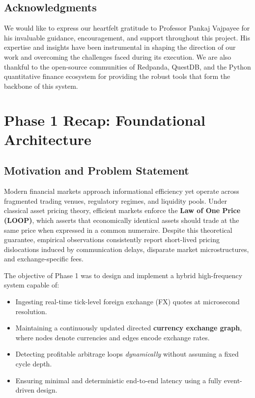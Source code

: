 \documentclass[letterpaper,11pt]{report}
\begin{document}
\newpage

\section*{Acknowledgments}\label{section:acknowledgments}
\pagestyle{plain}

We would like to express our heartfelt gratitude to Professor Pankaj Vajpayee for his invaluable guidance, encouragement, and support throughout this project. His expertise and insights have been instrumental in shaping the direction of our work and overcoming the challenges faced during its execution. We are also thankful to the open-source communities of Redpanda, QuestDB, and the Python quantitative finance ecosystem for providing the robust tools that form the backbone of this system.
\vspace{2in}

\newpage

\tableofcontents
\newpage

\setcounter{page}{1}

\chapter{Phase 1 Recap: Foundational Architecture}

\section{Motivation and Problem Statement}

Modern financial markets approach informational efficiency yet operate across fragmented trading venues, regulatory regimes, and liquidity pools. Under classical asset pricing theory, efficient markets enforce the \textbf{Law of One Price (LOOP)}, which asserts that economically identical assets should trade at the same price when expressed in a common numeraire. Despite this theoretical guarantee, empirical observations consistently report short-lived pricing dislocations induced by communication delays, disparate market microstructures, and exchange-specific fees.

The objective of Phase 1 was to design and implement a hybrid high-frequency system capable of:
\begin{itemize}
    \item Ingesting real-time tick-level foreign exchange (FX) quotes at microsecond resolution.
    \item Maintaining a continuously updated directed \textbf{currency exchange graph}, where nodes denote currencies and edges encode exchange rates.
    \item Detecting profitable arbitrage loops \emph{dynamically} without assuming a fixed cycle depth.
    \item Ensuring minimal and deterministic end-to-end latency using a fully event-driven design.
\end{itemize}
\end{document}
